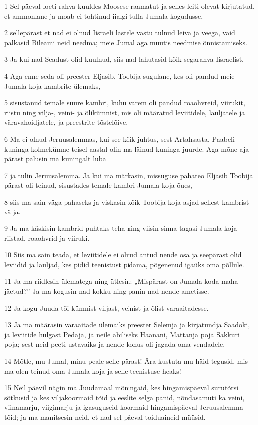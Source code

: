 \par 1 Sel päeval loeti rahva kuuldes Moosese raamatut ja selles leiti olevat kirjutatud, et ammonlane ja moab ei tohtinud iialgi tulla Jumala kogudusse,
\par 2 sellepärast et nad ei olnud Iisraeli lastele vastu tulnud leiva ja veega, vaid palkasid Bileami neid needma; meie Jumal aga muutis needmise õnnistamiseks.
\par 3 Ja kui nad Seadust olid kuulnud, siis nad lahutasid kõik segarahva Iisraelist.
\par 4 Aga enne seda oli preester Eljasib, Toobija sugulane, kes oli pandud meie Jumala koja kambrite ülemaks,
\par 5 sisustanud temale suure kambri, kuhu varem oli pandud roaohvreid, viirukit, riistu ning vilja-, veini- ja õlikümnist, mis oli määratud leviitidele, lauljatele ja väravahoidjatele, ja preestrite tõstelõive.
\par 6 Ma ei olnud Jeruusalemmas, kui see kõik juhtus, sest Artahsasta, Paabeli kuninga kolmekümne teisel aastal olin ma läinud kuninga juurde. Aga mõne aja pärast palusin ma kuningalt luba
\par 7 ja tulin Jeruusalemma. Ja kui ma märkasin, missuguse pahateo Eljasib Toobija pärast oli teinud, sisustades temale kambri Jumala koja õues,
\par 8 siis ma sain väga pahaseks ja viskasin kõik Toobija koja asjad sellest kambrist välja.
\par 9 Ja ma käskisin kambrid puhtaks teha ning viisin sinna tagasi Jumala koja riistad, roaohvrid ja viiruki.
\par 10 Siis ma sain teada, et leviitidele ei olnud antud nende osa ja seepärast olid leviidid ja lauljad, kes pidid teenistust pidama, põgenenud igaüks oma põllule.
\par 11 Ja ma riidlesin ülematega ning ütlesin: „Mispärast on Jumala koda maha jäetud?” Ja ma kogusin nad kokku ning panin nad nende ametisse.
\par 12 Ja kogu Juuda tõi kümnist viljast, veinist ja õlist varaaitadesse.
\par 13 Ja ma määrasin varaaitade ülemaiks preester Selemja ja kirjatundja Saadoki, ja leviitide hulgast Pedaja, ja neile abiliseks Haanani, Mattanja poja Sakkuri poja; sest neid peeti ustavaiks ja nende kohus oli jagada oma vendadele.
\par 14 Mõtle, mu Jumal, minu peale selle pärast! Ära kustuta mu häid tegusid, mis ma olen teinud oma Jumala koja ja selle teenistuse heaks!
\par 15 Neil päevil nägin ma Juudamaal mõningaid, kes hingamispäeval surutõrsi sõtkusid ja kes viljakoormaid tõid ja eeslite selga panid, nõndasamuti ka veini, viinamarju, viigimarju ja igasuguseid koormaid hingamispäeval Jeruusalemma tõid; ja ma manitsesin neid, et nad sel päeval toiduaineid müüsid.
